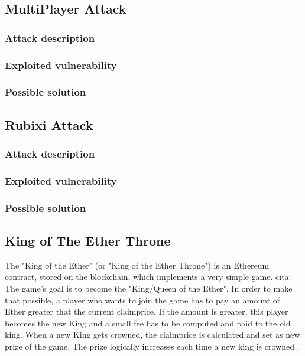 \subsection{MultiPlayer Attack}
\subsubsection{Attack description}
\subsubsection{Exploited vulnerability}
\subsubsection{Possible solution}

\subsection{Rubixi Attack}
\subsubsection{Attack description}
\subsubsection{Exploited vulnerability}
\subsubsection{Possible solution}



\subsection{King of The Ether Throne}
The "King of the Ether" (or "King of the Ether Throne") is an Ethereum contract, stored on the blockchain, which implements a very simple game. cita: %
The game's goal is to become the "King/Queen of the Ether". In order to make that possible, a player who wants to join the game has to pay an amount of Ether greater that the current claimprice. If the amount is greater, this player becomes the new King and a small fee has to be computed and paid to the old king. 
When a new King gets crowned, the claimprice is calculated and set as new prize of the game. The prize logically increases each time a new king is crowned \cite{paper2}. \\

